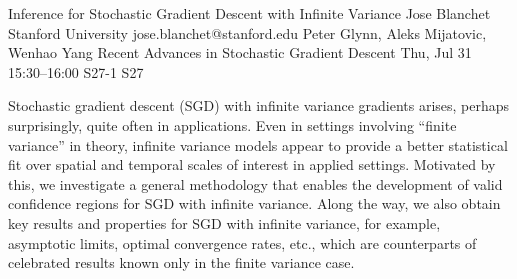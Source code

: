 \documentclass[12pt,lettersize,oneside]{book} %
\begin{document}
\begin{talk}
  {Inference for Stochastic Gradient Descent with Infinite Variance}%
  {Jose Blanchet}%
  {Stanford University}%
  {jose.blanchet@stanford.edu}%
  {Peter Glynn, Aleks Mijatovic, Wenhao Yang}%
  {Recent Advances in Stochastic Gradient Descent}%
  {Thu, Jul 31 15:30--16:00}%
  {S27-1}%
  {S27}%
    
                
Stochastic gradient descent (SGD) with infinite variance gradients arises, perhaps surprisingly, quite often in applications. Even in settings involving “finite variance” in theory, infinite variance models appear to provide a better statistical fit over spatial and temporal scales of interest in applied settings. Motivated by this, we investigate a general methodology that enables the development of valid confidence regions for SGD with infinite variance. Along the way, we also obtain key results and properties for SGD with infinite variance, for example, asymptotic limits, optimal convergence rates, etc., which are counterparts of celebrated results known only in the finite variance case.


\medskip


\end{talk}
\end{document}
